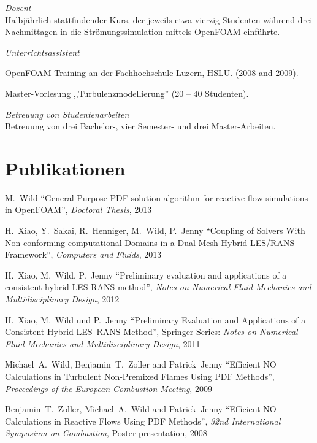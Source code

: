 \documentclass[line,11pt,a4paper]{../resume}
\begin{document}
\begin{resume}
\textsl{Dozent}\\
Halbjährlich stattfindender Kurs, der jeweils etwa vierzig Studenten während
drei Nachmittagen in die Strömungssimulation mittels OpenFOAM einführte.

\textsl{Unterrichtsassistent}
\begin{list2}
  \item OpenFOAM-Training an der Fachhochschule Luzern, HSLU. (2008 and 2009).
  \item Master-Vorlesung ,,Turbulenzmodellierung'' (20 -- 40 Studenten).
\end{list2}

\textsl{Betreuung von Studentenarbeiten}\\
Betreuung von drei Bachelor-, vier Semester- und drei Master-Arbeiten.

\section{\mysidestyle Publikationen}\vspace{2mm}
M.~Wild
``General Purpose PDF solution algorithm for reactive flow simulations in
OpenFOAM'', \textsl{Doctoral Thesis}, 2013

\vspace{-2mm}
H.~Xiao, Y.~Sakai, R.~Henniger, M.~Wild, P.~Jenny
``Coupling of Solvers With Non-conforming computational Domains in a Dual-Mesh
Hybrid LES/RANS Framework'', \textsl{Computers and Fluids}, 2013

\vspace{-2mm}
H.~Xiao, M.~Wild, P.~Jenny
``Preliminary evaluation and applications of a consistent hybrid LES-RANS
method'', \textsl{Notes on Numerical Fluid Mechanics and Multidisciplinary
Design}, 2012

\vspace{-2mm}
H.~Xiao, M.~Wild und P.~Jenny ``Preliminary Evaluation and
Applications of a Consistent Hybrid LES--RANS Method'', Springer Series:
\textsl{Notes on Numerical Fluid Mechanics and Multidisciplinary Design}, 2011

\vspace{-2mm}
Michael~A.~Wild, Benjamin~T.~Zoller and Patrick~Jenny
``Efficient $\mathrm{NO}$ Calculations in Turbulent Non-Premixed Flames Using
PDF Methods'', \textsl{Proceedings of the European Combustion Meeting}, 2009

\vspace{-2mm}
Benjamin~T.~Zoller, Michael~A.~Wild and Patrick~Jenny
``Efficient $\mathrm{NO}$ Calculations in Reactive Flows Using PDF Methods'',
\textsl{32nd International Symposium on Combustion}, Poster presentation, 2008



\end{resume}
\end{document}
